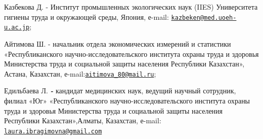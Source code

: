 Казбекова Д. - Институт промышленных экологических наук (IIES)
Университета гигиены труда и окружающей среды, Япония, е-mail:
\href{mailto:kazbeken@med.uoeh-u.ac.jp}{\nolinkurl{kazbeken@med.uoeh-u.ac.jp}};

Айтимова Ш. - начальник отдела экономических измерений и статистики
«Республиканского научно-исследовательского института охраны труда и
здоровья Министерства труда и социальной защиты населения Республики
Казахстан», Астана, Казахстан,
е-mail:\href{mailto:aitimova_80@mail.ru}{\nolinkurl{aitimova\_80@mail.ru}};

Едильбаева Л. \emph{{\bfseries -}} кандидат медицинских наук, ведущий
научный сотрудник, филиал «Юг» «Республиканского
научно-исследовательского института охраны труда и здоровья Министерства
труда и социальной защиты населения Республики Казахстан»,Алматы,
Казахстан, е-mail:
\href{mailto:laura.ibragimovna@gmail.com}{\nolinkurl{laura.ibragimovna@gmail.com}}